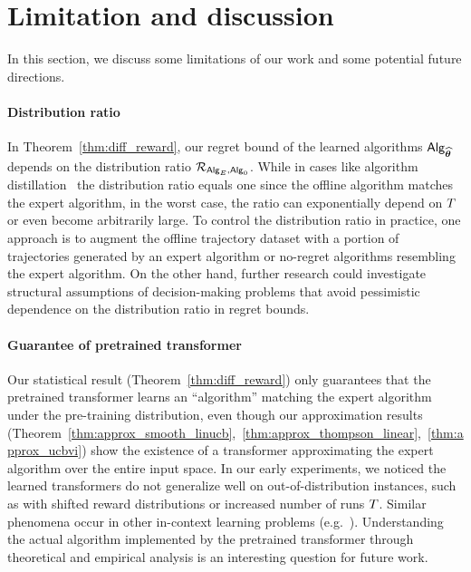 
\section{Limitation and discussion}
\label{sec:limitation}
In this section, we discuss some limitations of our work and some potential future directions.

\paragraph{Distribution ratio} In Theorem~\ref{thm:diff_reward}, our regret bound of the learned algorithms ${\mathsf{Alg}}_{{\widehat{{\boldsymbol \theta}}}}$ depends on the distribution ratio ${\mathcal{R}}_{{\mathsf{Alg}}_{{E}},{\mathsf{Alg}}_0}$. While in cases like algorithm distillation~\citep{laskin2022context} the distribution ratio equals one since the offline algorithm matches the expert algorithm, in the worst case, the ratio can exponentially depend on ${T}$ or even become arbitrarily large. To control the distribution ratio in practice, one approach is to augment the offline trajectory dataset with a portion of trajectories generated by an expert algorithm or no-regret algorithms resembling the expert algorithm. On the other hand, further research could investigate structural assumptions of decision-making problems that avoid pessimistic dependence on the distribution ratio in regret bounds.

\paragraph{Guarantee of pretrained transformer} Our statistical result (Theorem~\ref{thm:diff_reward}) only guarantees that the pretrained transformer learns an ``algorithm'' matching the expert algorithm under the pre-training distribution, even though our approximation results (Theorem~\ref{thm:approx_smooth_linucb},~\ref{thm:approx_thompson_linear},~\ref{thm:approx_ucbvi}) show the existence of a transformer approximating the expert algorithm over the entire input space. In our early experiments, we noticed the learned transformers do not generalize well on out-of-distribution instances, such as with shifted reward distributions or increased number of runs ${T}$. Similar phenomena occur in other in-context learning problems (e.g.~\cite{garg2022can}). Understanding the actual algorithm implemented by the pretrained transformer through theoretical and empirical analysis is an interesting question for future work.


